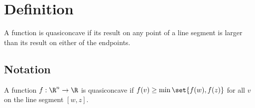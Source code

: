 
\section*{Definition}

A function is quasiconcave if its result on any point of a line segment is larger than its result on either of the endpoints.

\subsection*{Notation}

A function $f: \R ^n \to \R $ is quasiconcave if $f(v) \geq \min\set{f(w), f(z)}$ for all $v$ on the line segment $[w, z]$.

\blankpage